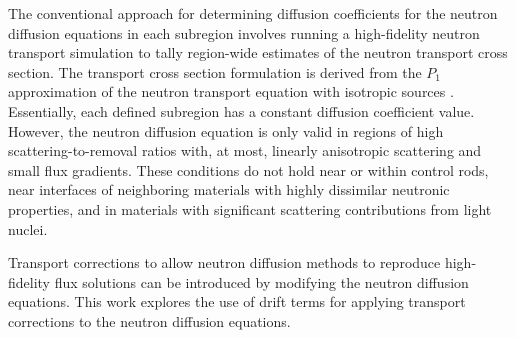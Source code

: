 The conventional approach for determining diffusion coefficients for the neutron diffusion
equations in each subregion involves
running a high-fidelity neutron transport simulation to tally region-wide estimates of the neutron
transport cross section. The transport cross section formulation is derived from the $P_1$
approximation of the neutron transport equation with isotropic sources \cite{bell_nuclear_1970}.
Essentially, each defined subregion has a constant diffusion coefficient value. However, the
neutron diffusion
equation is only valid in regions of high scattering-to-removal ratios with, at most, linearly
anisotropic scattering and small flux gradients. These conditions do not hold near or within
control rods, near interfaces of neighboring materials with highly dissimilar neutronic properties,
and in materials with significant scattering contributions from light nuclei.

Transport corrections to allow neutron diffusion methods to reproduce high-fidelity flux solutions
can be introduced by modifying the neutron diffusion equations. This work explores the use of
drift terms for applying transport corrections to the neutron diffusion
equations.



